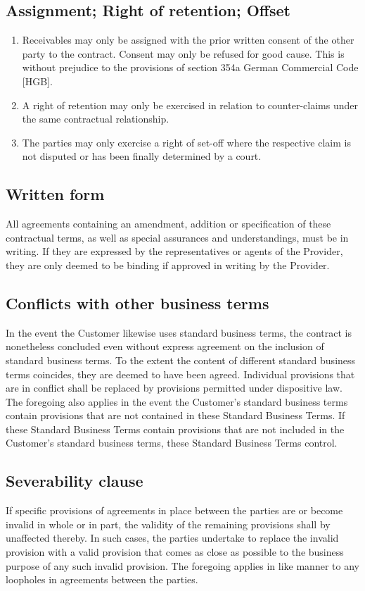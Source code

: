\documentclass{terms}
\begin{document}
\subsection{Assignment; Right of retention; Offset}
\begin{enumerate}
\item Receivables may only be assigned with the prior written consent of the other party to the contract. Consent may only be refused for good cause. This is without prejudice to the provisions of section 354a German Commercial Code [HGB].
\item A right of retention may only be exercised in relation to counter-claims under the same contractual relationship.
\item The parties may only exercise a right of set-off where the respective claim is not disputed or has been finally determined by a court.
\end{enumerate}
\subsection{Written form}
All agreements containing an amendment, addition or specification of these contractual terms, as well as special assurances and understandings, must be in writing. If they are expressed by the representatives or agents of the Provider, they are only deemed to be binding if approved in writing by the Provider.
\subsection{Conflicts with other business terms}
In the event the Customer likewise uses standard business terms, the contract is nonetheless concluded even without express agreement on the inclusion of standard business terms. To the extent the content of different standard business terms coincides, they are deemed to have been agreed. Individual provisions that are in conflict shall be replaced by provisions permitted under dispositive law. The foregoing also applies in the event the Customer's standard business terms contain provisions that are not contained in these Standard Business Terms. If these Standard Business Terms contain provisions that are not included in the Customer's standard business terms, these Standard Business Terms control.
\subsection{Severability clause}
If specific provisions of agreements in place between the parties are or become invalid in whole or in part, the validity of the remaining provisions shall by unaffected thereby. In such cases, the parties undertake to replace the invalid provision with a valid provision that comes as close as possible to the business purpose of any such invalid provision. The foregoing applies in like manner to any loopholes in agreements between the parties.
\end{document}
